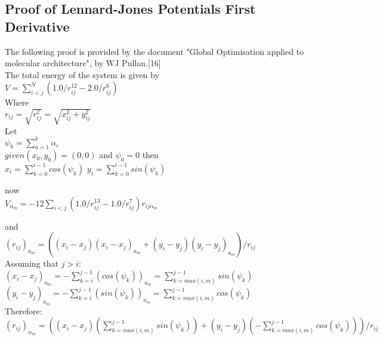 \documentclass{report}
\begin{document}
\begin{appendix}
\section{Proof of Lennard-Jones Potentials First Derivative}

The following proof is provided by the document "Global Optimisation applied to
molecular architecture", by WJ Pullan.[16] \\

The total energy of the system is given by\\

\( V = \sum_{i<j}^{N}(1.0 / r_{ij}^{12} - 2.0/r_{ij}^6)\)\\

Where\\

\( r_{ij} = \sqrt{r_{ij}^2} = \sqrt{x_{ij}^2 + y_{ij}^2} \)\\

Let\\

\(\psi_{k} = \sum_{a=1}^{k} \alpha_{i}\)\\

\(given (x_{0},y_{0}) = (0,0)\) and \( \psi_{0} = 0\) then\\

\(x_{i} = \sum_{k=0}^{i-1}cos(\psi_{k})\)
\(y_{i} = \sum_{k=0}^{i-1}sin(\psi_{k})\)

now\\

\(V_{\alpha_{m}} = -12 \sum_{i<j}(1.0/r_{ij}^{13} - 1.0 / r_{ij}^{7}) r_{ij \alpha_{m}}\)

and\\

\( (r_{ij})_{a_{m}} = ((x_{i}-x_{j})(x_{i}-x_{j})_{a_{m}} + (y_{i} - y_{j})(y_{i}-y_{j})_{a_{m}})/r_{ij}\)\\

Assuming that $j > i$:\\

\( (x_{i} - x_{j})_{a_{m}} = - \sum_{k=i}^{j-1}(cos(\psi_{k}))_{a_{m}} = \sum_{k = max(i,m)}^{j-1} sin(\psi_{k})\)\\

\( (y_{i} - y_{j})_{a_{m}} = - \sum_{k=i}^{j-1}(sin(\psi_{k}))_{a_{m}} = \sum_{k = max(i,m)}^{j-1} cos(\psi_{k})\)\\

Therefore:\\

\( (r_{ij})_{\alpha_{m}} = ((x_{i} - x_{j})(\sum_{k=max(i,m)}^{j-1} sin(\psi_{k}))+(y_{i}-y_{j})(-\sum_{k=max(i,m)}^{j-1}cos(\psi_{k})))/r_{ij}\)\\


\end{appendix}
\end{document}
